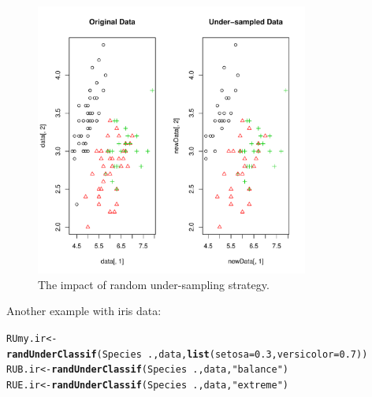 \documentclass[10pt,a4paper]{article}\usepackage[]{graphicx}\usepackage[]{color}
\makeatletter
\newcommand{\hlnum}[1]{\textcolor[rgb]{0.686,0.059,0.569}{#1}}%
\newcommand{\hlstr}[1]{\textcolor[rgb]{0.192,0.494,0.8}{#1}}%
\newcommand{\hlopt}[1]{\textcolor[rgb]{0,0,0}{#1}}%
\newcommand{\hlstd}[1]{\textcolor[rgb]{0.345,0.345,0.345}{#1}}%
\newcommand{\hlkwb}[1]{\textcolor[rgb]{0.69,0.353,0.396}{#1}}%
\newcommand{\hlkwc}[1]{\textcolor[rgb]{0.333,0.667,0.333}{#1}}%
\newcommand{\hlkwd}[1]{\textcolor[rgb]{0.737,0.353,0.396}{\textbf{#1}}}%
\newenvironment{kframe}{%
 \def\at@end@of@kframe{}%
 \ifinner\ifhmode%
  \def\at@end@of@kframe{\end{minipage}}%
  \begin{minipage}{\columnwidth}%
 \fi\fi%
 \def\FrameCommand##1{\hskip\@totalleftmargin \hskip-\fboxsep
 \colorbox{shadecolor}{##1}\hskip-\fboxsep
     \hskip-\linewidth \hskip-\@totalleftmargin \hskip\columnwidth}%
 \MakeFramed {\advance\hsize-\width
   \@totalleftmargin\z@ \linewidth\hsize
   \@setminipage}}%
 {\par\unskip\endMakeFramed%
 \at@end@of@kframe}
\newenvironment{knitrout}{}{} %
\makeatother
\begin{document}
\begin{knitrout}\footnotesize
{}\color{fgcolor}\begin{figure}

{\centering \includegraphics[width=0.8\textwidth]{figures/UBL-Iris_RU1-1} 

}

\caption[The impact of random under-sampling strategy]{The impact of random under-sampling strategy.}\label{fig:Iris_RU1}
\end{figure}


\end{knitrout}

Another example with iris data:

\begin{knitrout}\footnotesize
{}\color{fgcolor}\begin{kframe}
\begin{alltt}
  \hlstd{RUmy.ir} \hlkwb{<-} \hlkwd{randUnderClassif}\hlstd{(Species}\hlopt{~}\hlstd{., data,} \hlkwd{list}\hlstd{(}\hlkwc{setosa}\hlstd{=}\hlnum{0.3}\hlstd{,} \hlkwc{versicolor}\hlstd{=}\hlnum{0.7}\hlstd{))}
  \hlstd{RUB.ir} \hlkwb{<-} \hlkwd{randUnderClassif}\hlstd{(Species}\hlopt{~}\hlstd{., data,} \hlstr{"balance"}\hlstd{)}
  \hlstd{RUE.ir} \hlkwb{<-} \hlkwd{randUnderClassif}\hlstd{(Species}\hlopt{~}\hlstd{., data,} \hlstr{"extreme"}\hlstd{)}
\end{alltt}
\end{kframe}
\end{knitrout}
\end{document}
